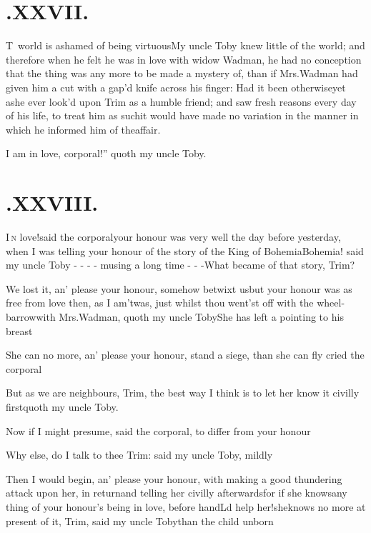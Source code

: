 \documentclass{article}
\begin{document}
\section{.\enspace XXVII.}

\lettrine{T}{\,} world is ashamed of being
vir\-tuous\tsh My uncle Toby knew little of the
world; and therefore when he felt he was in love with widow
Wadman, he had no conception that the thing was any more to
be made a mystery of, than if Mrs.\@ Wadman had given him a
cut with a gap’d knife across his finger: Had it been
otherwise\tsh yet as\break he ever look’d upon Trim
as a humble friend; and saw fresh reasons every day of his life, to
treat him as such\tsh it would have made no variation in
the manner in which he informed him of the\break affair.

\newpage
\lqq I am in love, corporal!” quoth my uncle
Toby.

\section{.\enspace XXVIII.}

\lettrine{I}{\,n} love!\tsh said the
corporal\tsk your honour was very well the day before yesterday,
when I was telling your honour of the story of the King of
Bohemia\break\null\tsk Bohemia! said my uncle Toby - - - -\break
musing a long time - - -\enspace What became of that story,
Trim?

\tsh We lost it, an’ please your honour, somehow betwixt
us\tsk but your honour was as free from love then, as I
am\tsh\break ’twas, just whilst thou went’st off with
the wheel-barrow\tsh with Mrs.\@ Wadman, quoth my
uncle Toby\tsh She has left a\pb
{} pointing to his breast\tsh

\tsh She can no more, an’ please your\break
honour, stand a siege, than she can fly\tsk\break
cried the corporal\tsh

\tsh But as we are neighbours, Trim,\break
\tsk the
best way I think is to let her know it civilly first\tsk quoth my
uncle Toby.

Now if I might presume, said the corporal, to differ from your
honour\tsh

\tsh Why else, do I talk to thee Trim: said my uncle
Toby, mildly\tsh

\tsh Then I would begin, an’ please your honour, with
making a good thundering attack upon her, in return\tsk and
telling her civilly afterwards\tsk for if she knows\pb any thing of
your honour’s being in love, before
hand\tsh L\tsk d help her!\tsk she\break knows no more at
present of it, Trim, said my uncle Toby\tsk than
the child\break
unborn\tsh
\end{document}
